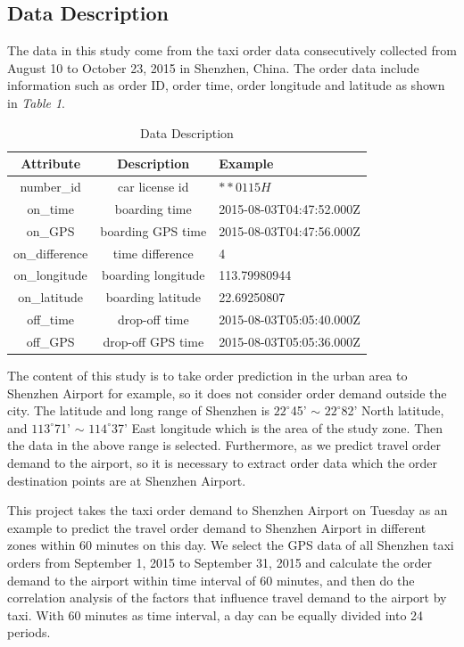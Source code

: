 \documentclass[sigconf]{acmart}
\begin{document}
\subsection{Data Description}
The data in this study come from the taxi order data consecutively collected from August 10 to October 23, 2015 in Shenzhen, China. The order data include information such as order ID, order time, order longitude and latitude as shown in \textit{Table 1}.
\begin{table}
  \caption{Data Description}
  \label{tab:freq}
  \begin{tabular}{ccl}
    \toprule
    Attribute&Description&Example\\
    \midrule
    number\_id&car license id& $\ast \ast 0115H$ \\
    on\_time&boarding time& 2015-08-03T04:47:52.000Z \\
    on\_GPS&boarding GPS time& 2015-08-03T04:47:56.000Z \\
    on\_difference&time difference& 4 \\
    on\_longitude&boarding longitude& 113.79980944 \\
    on\_latitude&boarding latitude& 22.69250807 \\
    off\_time&drop-off time& 2015-08-03T05:05:40.000Z \\
    off\_GPS&drop-off GPS time& 2015-08-03T05:05:36.000Z \\
  \bottomrule
\end{tabular}
\end{table}
The content of this study is to take order prediction in the urban area to Shenzhen Airport for example, so it does not consider order demand outside the city. The latitude and long range of Shenzhen is $22^{\circ}$45’ $\sim$ $22^{\circ}$82’ North latitude, and $113^{\circ}$71' $\sim$ $114^{\circ}$37' East longitude which is the area of the study zone. Then the data in the above range is selected. Furthermore, as we predict travel order demand to the airport, so it is necessary to extract order data which the order destination points are at Shenzhen Airport.

This project takes the taxi order demand to Shenzhen Airport on Tuesday as an example to predict the travel order demand to Shenzhen Airport in different zones within 60 minutes on this day. We select the GPS data of all Shenzhen taxi orders from September 1, 2015 to September 31, 2015 and calculate the order demand to the airport within time interval of 60 minutes, and then do the correlation analysis of the factors that influence travel demand to the airport by taxi. With 60 minutes as time interval, a day can be equally divided into 24 periods.
\end{document}
